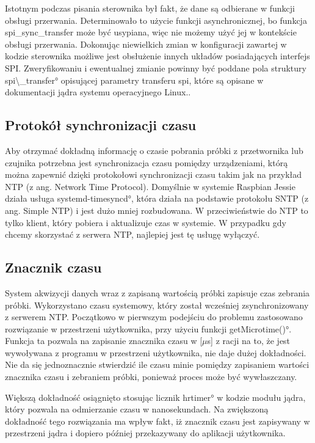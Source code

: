 Istotnym podczas pisania sterownika był fakt, że dane są odbierane w funkcji obsługi przerwania. Determinowało to użycie funkcji asynchronicznej, bo funkcja spi\_sync\_transfer może być usypiana, więc nie możemy użyć jej w kontekście obsługi przerwania.
Dokonując niewielkich zmian w konfiguracji zawartej w kodzie sterownika możliwe jest obsłużenie innych układów posiadających interfejs SPI. Zweryfikowaniu i ewentualnej zmianie powinny być poddane pola struktury \ang{spi\_transfer} opisującej parametry transferu spi, które są opisane w dokumentacji jądra systemu operacyjnego Linux.\cite{spiKernel}.

\subsection{Protokół synchronizacji czasu}

Aby otrzymać dokładną informację o czasie pobrania próbki z przetwornika lub czujnika potrzebna jest synchronizacja czasu pomiędzy urządzeniami, którą można zapewnić dzięki protokołowi synchronizacji czasu takim jak na przykład NTP (z ang. Network Time Protocol).
Domyślnie w systemie Raspbian Jessie działa usługa \ang{systemd-timesyncd}, która działa na podstawie protokołu SNTP (z ang. Simple NTP) i jest dużo mniej rozbudowana. W przeciwieństwie do NTP to tylko klient, który pobiera i aktualizuje czas w systemie. W przypadku gdy chcemy skorzystać z serwera NTP, najlepiej jest tę usługę wyłączyć\cite{ntp}.

\subsection{Znacznik czasu}

System akwizycji danych wraz z zapisaną wartością próbki zapisuje czas zebrania próbki. Wykorzystano czasu systemowy, który został wcześniej zsynchronizowany z serwerem NTP.
Początkowo w pierwszym podejściu do problemu zastosowano rozwiązanie w przestrzeni użytkownika, przy użyciu funkcji \ang{getMicrotime()}. Funkcja ta pozwala na zapisanie znacznika czasu w [$\mu$s] z racji na to, że jest wywoływana z programu w przestrzeni użytkownika, nie daje dużej dokładności. Nie da się jednoznacznie stwierdzić ile czasu minie pomiędzy zapisaniem wartości znacznika czasu i zebraniem próbki, ponieważ proces może być wywłaszczany.

Większą dokładność osiągnięto stosując licznik \ang{hrtimer} w kodzie modułu jądra, który pozwala na odmierzanie czasu w nanosekundach. Na zwiększoną dokładność tego rozwiązania ma wpływ fakt, iż znacznik czasu jest zapisywany w przestrzeni jądra i dopiero później przekazywany do aplikacji użytkownika.


